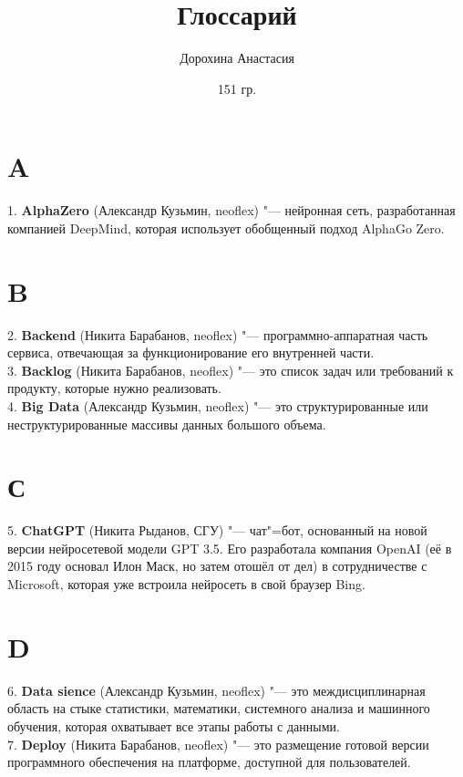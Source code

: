 \documentclass[14 pt]{extarticle}
\title{Глоссарий}
\author{Дорохина Анастасия}
\date{151 гр.}
\begin{document}
\maketitle

\section*{A}
    1. \textbf{AlphaZero} (Александр Кузьмин, neoflex) "--- нейронная сеть, разработанная компанией DeepMind, которая использует обобщенный подход AlphaGo Zero.
\section*{B}
    2. \textbf{Backend} (Никита Барабанов, neoflex) "--- программно-аппаратная часть сервиса, отвечающая за функционирование его внутренней части.\\

    3. \textbf{Backlog} (Никита Барабанов, neoflex) "--- это список задач или требований к продукту, которые нужно реализовать.\\
    
    4. \textbf{Big Data} (Александр Кузьмин, neoflex) "--- это структурированные или неструктурированные массивы данных большого объема.
    
\section*{С}
    5. \textbf{ChatGPT} (Никита Рыданов, СГУ) "--- чат"=бот, основанный на новой версии нейросетевой модели GPT 3.5. Его разработала компания OpenAI (её в 2015 году основал Илон Маск, но затем отошёл от дел) в сотрудничестве с Microsoft, которая уже встроила нейросеть в свой браузер Bing. \\
    
\section*{D}
    6. \textbf{Data sience} (Александр Кузьмин, neoflex) "--- это междисциплинарная область на стыке статистики, математики, системного анализа и машинного обучения, которая охватывает все этапы работы с данными. \\
    
    7. \textbf{Deploy} (Никита Барабанов, neoflex) "--- это размещение готовой версии программного обеспечения на платформе, доступной для пользователей. \\
\end{document}
